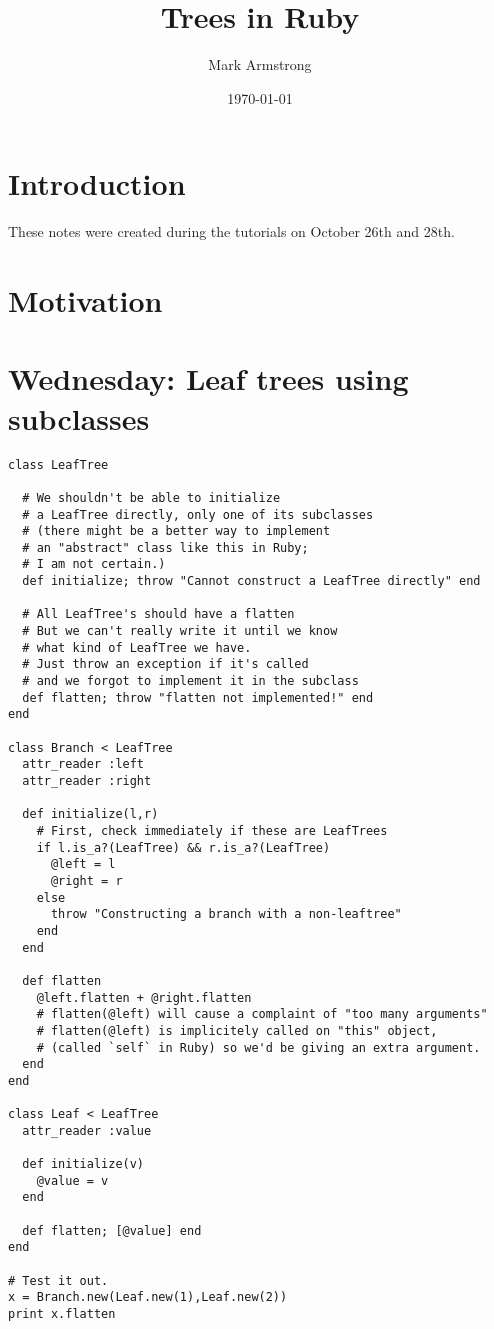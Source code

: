 \documentclass[11pt]{article}
\author{Mark Armstrong}
\date{\today}
\title{Trees in Ruby}
\begin{document}
\maketitle
\tableofcontents


\section{Introduction}
\label{sec:org3008666}
These notes were created during the tutorials on October 26th and 28th.

\section{Motivation}
\label{sec:org389bbd9}

\section{Wednesday: Leaf trees using subclasses}
\label{sec:org992f739}
\begin{verbatim}
class LeafTree

  # We shouldn't be able to initialize
  # a LeafTree directly, only one of its subclasses
  # (there might be a better way to implement
  # an "abstract" class like this in Ruby;
  # I am not certain.)
  def initialize; throw "Cannot construct a LeafTree directly" end
  
  # All LeafTree's should have a flatten
  # But we can't really write it until we know
  # what kind of LeafTree we have.
  # Just throw an exception if it's called
  # and we forgot to implement it in the subclass
  def flatten; throw "flatten not implemented!" end
end

class Branch < LeafTree
  attr_reader :left
  attr_reader :right
  
  def initialize(l,r)
    # First, check immediately if these are LeafTrees
    if l.is_a?(LeafTree) && r.is_a?(LeafTree)
      @left = l
      @right = r
    else
      throw "Constructing a branch with a non-leaftree"
    end
  end

  def flatten
    @left.flatten + @right.flatten
    # flatten(@left) will cause a complaint of "too many arguments"
    # flatten(@left) is implicitely called on "this" object,
    # (called `self` in Ruby) so we'd be giving an extra argument.
  end
end

class Leaf < LeafTree
  attr_reader :value
  
  def initialize(v)
    @value = v
  end

  def flatten; [@value] end
end

# Test it out.
x = Branch.new(Leaf.new(1),Leaf.new(2))
print x.flatten
\end{verbatim}
\end{document}
